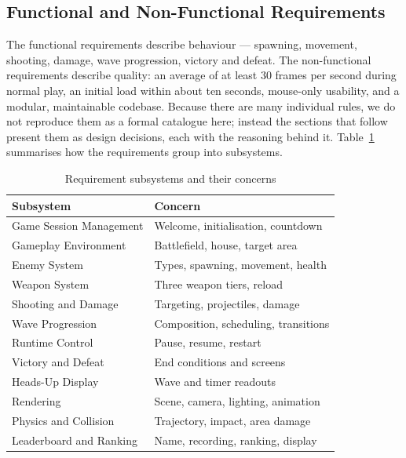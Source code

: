 \documentclass[12pt,a4paper]{report}
\begin{document}
\subsection{Functional and Non-Functional Requirements}

The functional requirements describe behaviour --- spawning, movement, shooting,
damage, wave progression, victory and defeat. The non-functional requirements
describe quality: an average of at least 30 frames per second during normal
play, an initial load within about ten seconds, mouse-only usability, and a
modular, maintainable codebase. Because there are many individual rules, we do
not reproduce them as a formal catalogue here; instead the sections that follow
present them as design decisions, each with the reasoning behind it.
Table~\ref{tab:subsystems} summarises how the requirements group into
subsystems.

\begin{table}[h]
\centering
\caption{Requirement subsystems and their concerns}
\label{tab:subsystems}
\begin{tabular}{|p{5.5cm}|p{7.0cm}|}
\hline
Subsystem & Concern \\
\hline
Game Session Management & Welcome, initialisation, countdown \\
\hline
Gameplay Environment & Battlefield, house, target area \\
\hline
Enemy System & Types, spawning, movement, health \\
\hline
Weapon System & Three weapon tiers, reload \\
\hline
Shooting and Damage & Targeting, projectiles, damage \\
\hline
Wave Progression & Composition, scheduling, transitions \\
\hline
Runtime Control & Pause, resume, restart \\
\hline
Victory and Defeat & End conditions and screens \\
\hline
Heads-Up Display & Wave and timer readouts \\
\hline
Rendering & Scene, camera, lighting, animation \\
\hline
Physics and Collision & Trajectory, impact, area damage \\
\hline
Leaderboard and Ranking & Name, recording, ranking, display \\
\hline
\end{tabular}
\end{table}
\end{document}
